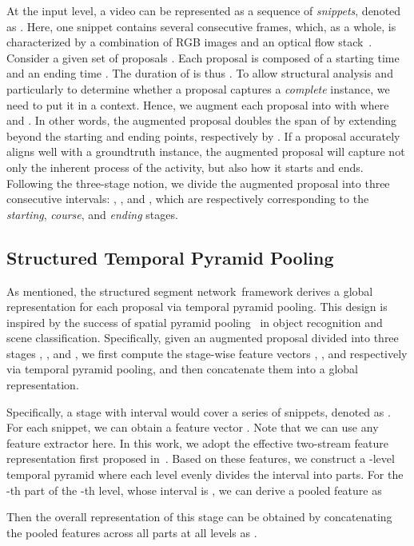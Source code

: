 \documentclass[10pt,twocolumn,letterpaper]{article}
\newcommand{\SSN}{structured segment network}
\begin{document}
At the input level, a video can be represented as a sequence of  \emph{snippets},
denoted as .
Here, one snippet contains several consecutive frames, which, as a whole, is
characterized by a combination of RGB images and an optical flow stack~\cite{Simonyan14TwoStream}.
Consider a given set of  proposals .
Each proposal  is composed of a starting time  and an ending time .
The duration of  is thus .
To allow structural analysis and particularly to determine whether a proposal
captures a \emph{complete} instance, we need to put it in a context.
Hence, we augment each proposal   into
 with
where  and .
In other words, the augmented proposal  doubles the span of  by
extending beyond the starting and ending points, respectively by .
If a proposal accurately aligns well with a groundtruth instance, the augmented proposal
will capture not only the inherent process of the activity, but also how it starts and ends.
Following the three-stage notion, we divide the augmented proposal  into three
consecutive intervals:
, , and , which
are respectively corresponding to the \emph{starting}, \emph{course}, and \emph{ending} stages.


\subsection{Structured Temporal Pyramid Pooling}
\label{sec:stpp}

As mentioned, the \SSN~framework derives a global representation for
each proposal via temporal pyramid pooling.
This design is inspired by the success of spatial pyramid
pooling~\cite{Lazebnik2006Beyond,He2014SPP} in object recognition
and scene classification.
Specifically, given an augmented proposal  divided into three
stages , , and , we first compute the stage-wise
feature vectors , , and  respectively
via temporal pyramid pooling, and then concatenate them into
a global representation.

Specifically, a stage with interval  would cover a series
of snippets, denoted as . For each snippet,
we can obtain a feature vector .
Note that we can use any feature extractor here. In this work, we
adopt the effective two-stream feature representation first proposed in~\cite{Simonyan14TwoStream}.
Based on these features, we construct a -level temporal pyramid where each level evenly divides the interval into  parts.
For the -th part of the -th level, whose interval is ,
we can derive a pooled feature as

Then the overall representation of this stage can be obtained by
concatenating the pooled features across all parts at all levels
as
.
\end{document}
